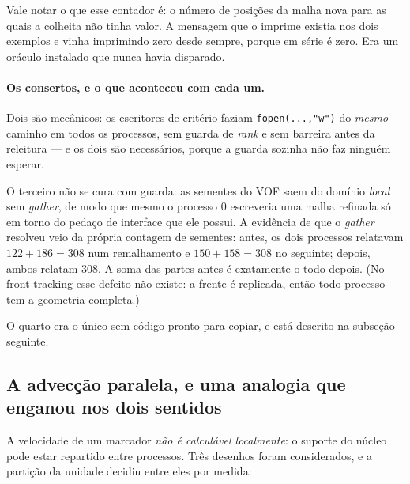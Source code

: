 Vale notar o que esse contador \'e: o n\'umero de posi\c{c}\~oes da malha nova
para as quais a colheita n\~ao tinha valor. A mensagem que o imprime existia nos
dois exemplos e vinha imprimindo zero desde sempre, porque em s\'erie \'e zero.
Era um or\'aculo instalado que nunca havia disparado.

\paragraph{Os consertos, e o que aconteceu com cada um.}


Dois s\~ao mec\^anicos: os escritores de crit\'erio faziam
\texttt{fopen(...,"w")} do \emph{mesmo} caminho em todos os processos, sem guarda
de \emph{rank} e sem barreira antes da releitura --- e os dois s\~ao necess\'arios,
porque a guarda sozinha n\~ao faz ningu\'em esperar.

O terceiro n\~ao se cura com guarda: as sementes do VOF saem do dom\'inio
\emph{local} sem \emph{gather}, de modo que mesmo o processo 0 escreveria uma
malha refinada s\'o em torno do peda\c{c}o de interface que ele possui. A
evid\^encia de que o \emph{gather} resolveu veio da pr\'opria contagem de
sementes: antes, os dois processos relatavam $122+186=308$ num remalhamento e
$150+158=308$ no seguinte; depois, ambos relatam 308. A soma das partes antes \'e
exatamente o todo depois. (No front-tracking esse defeito n\~ao existe: a frente
\'e replicada, ent\~ao todo processo tem a geometria completa.)

O quarto era o \'unico sem c\'odigo pronto para copiar, e est\'a descrito na
subse\c{c}\~ao seguinte.

\subsection{A advec\c{c}\~ao paralela, e uma analogia que enganou nos dois sentidos}
\label{sec:posse}

A velocidade de um marcador \emph{n\~ao \'e calcul\'avel localmente}: o suporte do
n\'ucleo pode estar repartido entre processos. Tr\^es desenhos foram considerados,
e a parti\c{c}\~ao da unidade decidiu entre eles por medida:

